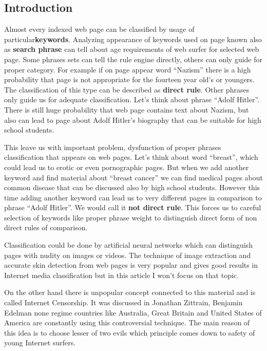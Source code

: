 \documentclass[9pt,a4paper]{extarticle}
\begin{document}
\begin{multicols}{2}
\section{Introduction}
Almost every indexed web page can be classified by usage of particular\textbf{keywords}. Analyzing appearance of keywords used on page known also as \textbf{search phrase} can tell about age requirements of web surfer for selected web page. Some phrases sets can tell the rule engine directly, others can only guide for proper category. For example if on page appear word  ``Nazism'' there is a high probability that page is not appropriate for the fourteen year old’s or youngers. The classification of this type can be described as  \textbf{direct rule}. Other phrases only guide us for adequate classification. Let’s think about phrase ``Adolf Hitler''. There is still huge probability that web page contains text about Nazism, but also can lead to page about Adolf Hitler’s biography that can be  suitable for high school students.

This leave us with important problem, dysfunction of proper phrases classification that appears on web pages. Let's think about word ``breast'', which could lead us to erotic or even pornographic pages. But when we add another keyword and find material about ``breast cancer'' we can find medical pages about common disease that can be discussed also by high school students. However this time adding another keyword can lead us to very different pages in comparison to phrase ``Adolf Hitler''. We would call it \textbf{not direct rule}. This forces us to careful selection of keywords like proper phrase weight to distinguish direct form of non direct rules of comparison.

Classification could be done by artificial neural networks which can distinguish pages with nudity on images or videos\cite{will_archer_arentz_classifying_nodate, radhouane_guermazi_combining_2007, giuseppe_amato_detection_2009}. The technique of image extraction and accurate skin detection from web pages is very popular and gives good results in Internet media classification\cite{mohammad_reza_mahmoodi_high_nodate,paul_greenfield_netalert_2001} but in this article I won't focus on that topic. 

On the other hand there is unpopular concept connected to this material and  is called Internet Censorship. It was discussed in Jonathan Zittrain, Benjamin Edelman\cite{jonathan_zittrain_internet_2003} none regime countries like Australia, Great Britain and United States of America are constantly using this controversial technique. The main reason of this idea is to choose lesser of two evils which principle comes down to safety of young Internet surfers\cite{piotr_luczuk_cyberwojna_2016,john_g._palfrey_jr._four_2010}.


\end{multicols}
\end{document}
